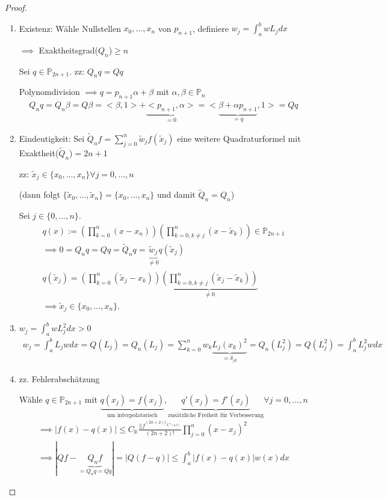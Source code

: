 \begin{proof}
	\begin{enumerate}
		\item Existenz: Wähle Nullstellen $x_0, ..., x_n$ von $p_{n+1}$, definiere $w_j = \int_{a}^{b} wL_j dx$
		
		$\implies$ Exaktheitsgrad($Q_n$)$\geq n$
		
		Sei $q \in \mathbb{P}_{2n+1}$. zz: $Q_nq = Qq$
		
		Polynomdivision $\implies q = p_{n+1} \alpha + \beta$ mit $\alpha, \beta \in \mathbb{P}_n$
		\begin{align*}
			Q_nq = Q_n\beta = Q\beta = <\beta, 1> + \underbrace{<p_{n+1}, \alpha>}_{=0} = <\underbrace{\beta + \alpha p_{n+1}}_{=q} , 1> = Qq
		\end{align*}
		
		\item Eindeutigkeit: Sei $\tilde{Q}_nf = \sum_{j=0}^{n} \tilde{w}_j f(\tilde{x}_j)$ eine weitere Quadraturformel mit Exaktheit($\tilde{Q}_n$)$=2n+1$
		
		zz: $\tilde{x}_j \in \{x_0, ..., x_n\} \forall j=0, ..., n$
		
		(dann folgt $\{\tilde{x}_0, ..., \tilde{x}_n\} = \{x_0, ..., x_n\}$ und damit $\tilde{Q}_n = Q_n$)
		
		Sei $j \in \{0, ..., n\}$.
		\begin{align*}
			q(x) := \left(\prod_{k=0}^{n} (x-x_n) \right) \left( \prod_{k=0, k\neq j}^{n} (x-\tilde{x}_k) \right) \in \mathbb{P}_{2n+1}\\
			\implies 0 = Q_nq = Qq = \tilde{Q}_nq = \underbrace{\tilde{w}_j}_{\neq 0} q(\tilde{x}_j)\\
			q(\tilde{x}_j) = \left( \prod_{k=0}^{n} (\tilde{x}_j - x_k) \right) \underbrace{\left( \prod_{k=0, k\neq j}^{n} (\tilde{x}_j - \tilde{x}_k) \right)}_{\neq 0}\\
			\implies \tilde{x}_j \in \{x_0, ..., x_n\}.
		\end{align*}
		
		\item $w_j = \int_{a}^{b} wL_j^2 dx > 0$
		\begin{align*}
			w_j = \int_{a}^{b} L_jw dx = Q(L_j) = Q_n(L_j) = \sum_{k=0}^{n} w_k \underbrace{L_j(x_k)^2}_{=\delta_{jk}} = Q_n(L_j^2) = Q(L_j^2) = \int_{a}^{b} L_j^2 w dx
		\end{align*}
		
		\item zz. Fehlerabschätzung
		
		Wähle $q \in \mathbb{P}_{2n+1}$ mit $\underbrace{q(x_j) = f(x_j)}_{\text{um interpolatorisch}}, \underbrace{q'(x_j)=f'(x_j)}_{\text{zusätzliche Freiheit für Verbesserung}} \forall j=0, ..., n$
		\begin{align*}
			\implies |f(x) - q(x)| \leq C_\mathbb{K} \frac{||f^{(2n+2)||_{L^\infty(a,b)}}}{(2n+2)!} \prod_{j=0}^{n} (x-x_j)^2\\
			\implies |Qf - \underbrace{Q_nf}_{=Q_nq=Qq}| = |Q(f-q)| \leq \int_{a}^{b} |f(x) - q(x)| w(x) dx
		\end{align*}
	\end{enumerate}
\end{proof}

